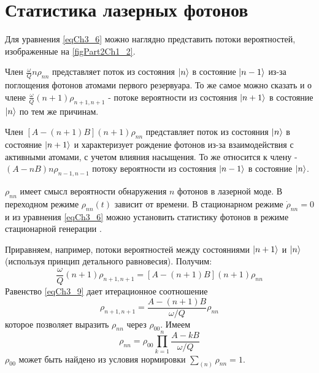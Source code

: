 \section{Статистика лазерных фотонов}
Для уравнения \eqref{eqCh3_6} можно наглядно представить потоки
вероятностей, изображенные на \autoref{figPart2Ch1_2}. 



Член $\frac{\omega}{Q} n \rho_{nn}$ представляет поток из состояния
$\ket{n}$ в состояние $\ket{n - 1}$ из-за 
поглощения фотонов атомами первого резервуара. То же самое можно
сказать и о члене $\frac{\omega}{Q} \left(n + 1\right) \rho_{n + 1, n
  + 1}$ - потоке вероятности из состояния $\ket{n + 1}$ в состояние
$\ket{n}$ по тем же причинам. 

Член $\left[A - \left(n + 1\right) B\right]\left(n + 1\right)
\rho_{nn}$ представляет поток из 
состояния $\ket{n}$ в состояние  
$\ket{n + 1}$ и характеризует рождение фотонов из-за
взаимодействия с активными атомами, с учетом влияния насыщения. То же
относится к члену   - $\left(A - n B\right)n \rho_{n - 1, n - 1}$
потоку вероятности из состояния $\ket{n - 1}$ в состояние
$\ket{n}$.  

$\rho_{nn}$ имеет смысл вероятности обнаружения $n$ фотонов в лазерной
моде. В переходном режиме $\rho_{nn}\left(t\right)$ зависит от
времени. В стационарном режиме $\dot{\rho}_{nn} = 0$
и из уравнения \autoref {eqCh3_6} можно установить статистику фотонов в режиме
стационарной генерации \cite{bScally1974}. 

Приравняем, например, потоки вероятностей между состояниями 
$\ket{n + 1}$ и $\ket{n}$
(используя принцип детального равновесия). Получим: 
\begin{equation}
\frac{\omega}{Q}\left(n + 1\right)\rho_{n + 1, n + 1} =
\left[A - \left(n + 1\right)B\right]\left(n + 1\right)\rho_{nn}
\label{eqCh3_9}
\end{equation}
Равенство \eqref{eqCh3_9} дает итерационное соотношение
\begin{equation}
\rho_{n + 1, n + 1} = 
\frac{A - \left(n + 1\right)B}{\omega/Q} \rho_{nn}
\label{eqCh3_10}
\end{equation}
которое позволяет выразить $\rho_{nn}$ через $\rho_{00}$.  Имеем
\begin{equation}
\rho_{nn} = \rho_{00}\prod_{k = 1}^n
\frac{A - k B}{\omega/Q} 
\label{eqCh3_11}
\end{equation}
$\rho_{00}$ может быть найдено из условия нормировки
$\sum_{(n)}\rho_{nn} = 1$.

